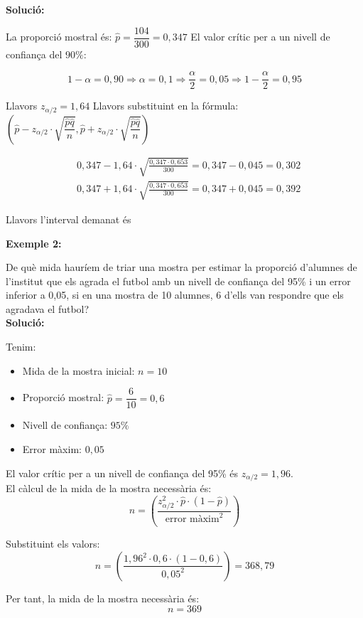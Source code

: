 \documentclass[12pt]{article}
\begin{document}
\begin{exemple} [title=] \noindent

\textbf{Solució:}

La proporció mostral és: $\hat{p}=\dfrac{104}{300}=0,347$
El valor crític per a un nivell de confiança del $90 \%$:

$$
1-\alpha=0,90 \Rightarrow \alpha=0,1 \Rightarrow \frac{\alpha}{2}=0,05 \Rightarrow 1-\frac{\alpha}{2}=0,95
$$

Llavors $z_{\alpha / 2}=1,64$
Llavors substituint en la fórmula: $\left(\hat{p}-z_{\alpha / 2} \cdot \sqrt{\dfrac{\hat{p} \hat{q}}{n}}, \hat{p}+z_{\alpha / 2} \cdot \sqrt{\dfrac{\hat{p} \hat{q}}{n}}\right)$

$$
\begin{aligned}
& 0,347-1,64 \cdot \sqrt{\frac{0,347 \cdot 0,653}{300}}=0,347-0,045=0,302 \\
& 0,347+1,64 \cdot \sqrt{\frac{0,347 \cdot 0,653}{300}}=0,347+0,045=0,392
\end{aligned}
$$

Llavors l'interval demanat és 
\end{exemple}

\begin{exemple} [title=Exemple 2] \noindent
    \textbf{Exemple 2:}

De què mida hauríem de triar una mostra per estimar la proporció d'alumnes de l'institut que els agrada el futbol amb un nivell de confiança del 95\% i un error inferior a 0,05, si en una mostra de 10 alumnes, 6 d'ells van respondre que els agradava el futbol?\\


\textbf{Solució:}

Tenim:
\begin{itemize}
    \item Mida de la mostra inicial: $n = 10$
    \item Proporció mostral: $\hat{p} = \dfrac{6}{10} = 0,6$
    \item Nivell de confiança: $95\%$
    \item Error màxim: $0,05$
\end{itemize}

El valor crític per a un nivell de confiança del 95\% és $z_{\alpha / 2} = 1,96$.\\

El càlcul de la mida de la mostra necessària és:
$$
n = \left(\dfrac{z_{\alpha / 2}^2 \cdot \hat{p} \cdot (1 - \hat{p})}{\text{error màxim}^2}\right)
$$

Substituint els valors:
$$
n = \left(\dfrac{1,96^2 \cdot 0,6 \cdot (1 - 0,6)}{0,05^2}\right) = 368,79
$$

Per tant, la mida de la mostra necessària és:
$$
n = 369
$$
\end{exemple}
\end{document}
